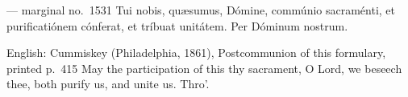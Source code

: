 \begin{appointedlatin}{ --- marginal no.\ 1531}
Tui nobis, quæsumus, Dómine, commúnio sacraménti, et purificatiónem cónferat,
et tríbuat unitátem. Per Dóminum nostrum.
\end{appointedlatin}

\begin{namedtranslation}{English: Cummiskey (Philadelphia, 1861), Postcommunion of this formulary, printed p.~415}
May the participation of this thy sacrament, O Lord, we beseech thee, both
purify us, and unite us. Thro'.
\end{namedtranslation}

\clearpage
